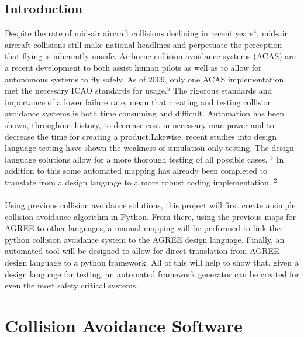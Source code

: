 \documentclass[12pt]{report}
\theoremstyle{plain}
\theoremstyle{definition}
\begin{document}
\section*{Introduction}
Despite the rate of mid-air aircraft collisions declining in recent years$^{4}$, mid-air aircraft collisions still make national headlines and perpetuate the perception that flying is inherently unsafe.  Airborne collision avoidance systems (ACAS) are a recent development to both assist human pilots as well as to allow for autonomous systems to fly safely.  As of 2009, only one ACAS implementation met the necessary ICAO standards for usage.$^{5}$  The rigorous standards and importance of a lower failure rate, mean that creating and testing collision avoidance systems is both time consuming and difficult.  Automation has been shown, throughout history, to decrease cost in necessary man power and to decrease the time for creating a product.Likewise, recent studies into design language testing have shown the weakness of simulation only testing.  The design language solutions allow for a more thorough testing of all possible cases. $^{3}$  In addition to this some automated mapping has already been completed to translate from a design language to a more robust coding implementation. $^{2}$\\
\\
Using previous collision avoidance solutions, this project will first create a simple collision avoidance algorithm in Python.  From there, using the previous maps for AGREE to other languages, a manual mapping will be performed to link the python collision avoidance system to the AGREE design language.  Finally, an automated tool will be designed to allow for direct translation from AGREE design language to a python framework.  All of this will help to show that, given a design language for testing, an automated framework generator can be created for even the most safety critical systems. 

\chapter*{Collision Avoidance Software}
\end{document}

